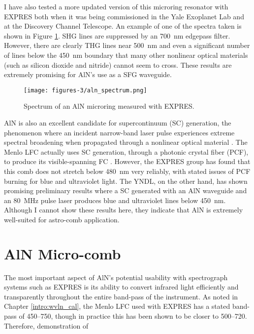 I have also tested a more updated version of this microring resonator with EXPRES both when it was being commissioned in the Yale Exoplanet Lab and at the Discovery Channel Telescope. An example of one of the spectra taken is shown in Figure \ref{fig:aln_spectrum}. SHG lines are suppressed by an \SI{700}{\nano\meter} edgepass filter. However, there are clearly THG lines near \SI{500}{\nano\meter} and even a significant number of lines below the \SI{450}{\nano\meter} boundary that many other nonlinear optical materials (such as silicon dioxide and nitride) cannot seem to cross. These results are extremely promising for AlN's use as a SFG waveguide.

\begin{figure}
    \centering
    \texttt{[image: figures-3/aln\_spectrum.png]}
    \caption{Spectrum of an AlN microring measured with EXPRES.}
    \label{fig:aln_spectrum}
\end{figure}

AlN is also an excellent candidate for supercontinuum (SC) generation, the phenomenon where an incident narrow-band laser pulse experiences extreme spectral broadening when propagated through a nonlinear optical material \citep{Dudley2006}. The Menlo LFC actually uses SC generation, through a photonic crystal fiber (PCF), to produce its visible-spanning FC \citep{Probst2014}. However, the EXPRES group has found that this comb does not stretch below \SI{480}{\nano\meter} very reliably, with stated issues of PCF burning for blue and ultraviolet light. The YNDL, on the other hand, has shown promising preliminary results where a SC generated with an AlN waveguide and an \SI{80}{\mega\hertz} pulse laser produces blue and ultraviolet lines below \SI{450}{\nano\meter}. Although I cannot show these results here, they indicate that AlN is extremely well-suited for astro-comb application.

\section{AlN Micro-comb}

The most important aspect of AlN's potential usability with spectrograph systems such as EXPRES is its ability to convert infrared light efficiently and transparently throughout the entire band-pass of the instrument. As noted in Chapter \ref{intro:wvln_cal}, the Menlo LFC used with EXPRES has a stated band-pass of 450--750\nm, though in practice this has been shown to be closer to 500--720\nm. Therefore, demonstration of 

